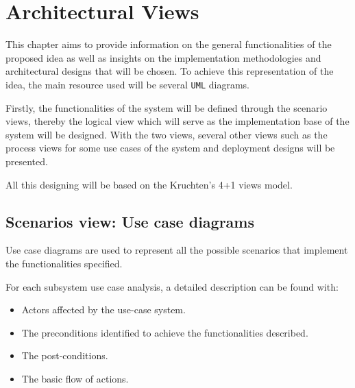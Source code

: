 \section{Architectural Views}
This chapter aims to provide information on the general functionalities of the proposed idea 
as well as insights on the implementation methodologies and architectural designs that will be chosen. 
To achieve this representation of the idea, the main resource used will be several \texttt{UML} diagrams.

Firstly, the functionalities of the system will be defined through the scenario views, thereby the logical 
view which will serve as the implementation base of the system will be designed. 
With the two views, several other views such as the process views for some use cases of the system and 
deployment designs will be presented.

All this designing will be based on the Kruchten’s 4+1 views model\cite{ArchitecturalBlueprints4+1}.

\subsection{Scenarios view: Use case diagrams}

Use case diagrams are used to represent all the possible scenarios that implement the functionalities specified.

For each subsystem use case analysis, a detailed description can be found with:
\begin{itemize}
    \item Actors affected by the use-case system.
    \item The preconditions identified to achieve the functionalities described.
    \item The post-conditions.
    \item The basic flow of actions.
\end{itemize}


